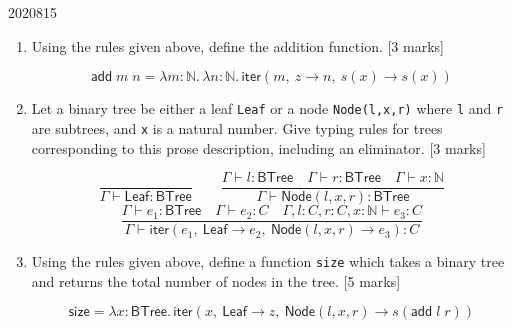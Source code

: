\documentclass[10pt,\jkfside,a4paper]{article}
\newcommand{\answer}[1]{
    \begin{tcolorbox}[colframe=black, colback=white, sharp corners, boxrule=0.2mm, breakable]
        #1
    \end{tcolorbox}
}
\newcommand{\qmarks}[1]{\hspace*{\fill}[#1]}
\begin{document}
\begin{examquestion}{2020}{8}{15}
\begin{enumerate}
\begin{enumerate}
{                        \[ \frac{\Gamma \vdash e_1 : \mathbb{N} \quad \Gamma \vdash e_2 : C \quad \Gamma, x : C \vdash e_3 : C}{\Gamma \vdash \mathsf{iter}(e_1, z \rightarrow e_2, s(x) \rightarrow e_3): C}\]
                    }

                \item
                    Using the rules given above, define the addition function.
                    \qmarks{3 marks}

                    \answer{
                        \[
                            \mathsf{add}\;m\;n = \lambda m : \mathbb{N}.\, \lambda n : \mathbb{N}.\, \mathsf{iter}(m,\ z \to n,\ s(x) \to s(x))
                        \]
                    }

                \item
                    Let a binary tree be either a leaf \texttt{Leaf} or a node
                    \texttt{Node(l,x,r)} where \texttt{l} and \texttt{r} are subtrees,
                    and \texttt{x} is a natural number. Give typing rules for trees
                    corresponding to this prose description, including an eliminator.
                    \qmarks{3 marks}

                    \answer{
                        \[
                            \frac{}{\Gamma \vdash \mathsf{Leaf} : \mathsf{BTree}}
                            \qquad
                            \frac{\Gamma \vdash l : \mathsf{BTree} \quad \Gamma \vdash r : \mathsf{BTree} \quad \Gamma \vdash x : \mathbb{N}}{\Gamma \vdash \mathsf{Node}(l, x, r) : \mathsf{BTree}}
                        \]
                        \[
                            \frac{\Gamma \vdash e_1 : \mathsf{BTree} \quad \Gamma \vdash e_2 : C \quad \Gamma, l : C, r : C, x : \mathbb{N} \vdash e_3 : C}{\Gamma \vdash \mathsf{iter}(e_1,\ \mathsf{Leaf} \to e_2,\ \mathsf{Node}(l, x, r) \to e_3) : C}
                        \]
                    }

                \item
                    Using the rules given above, define a function \texttt{size} which
                    takes a binary tree and returns the total number of nodes in the
                    tree. \qmarks{5 marks}

                    \answer{
                        \[
                            \mathsf{size} = \lambda x : \mathsf{BTree}.\, \mathsf{iter}(x,\ \mathsf{Leaf} \to z,\ \mathsf{Node}(l, x, r) \to s(\mathsf{add}\;l\;r))
                        \]
                    }


\end{enumerate}
\end{enumerate}
\end{examquestion}
\end{document}
